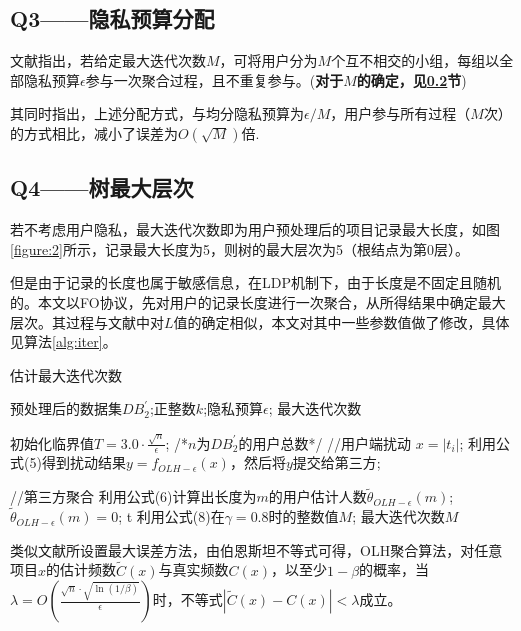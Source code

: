 \documentclass[UTF8,a4paper]{ctexart}
\begin{document}
  \subsection{Q3——隐私预算分配}
  \label{section:Q3}
  文献\cite{wang2018privtrie}指出，若给定最大迭代次数$M$，可将用户分为$M$个互不相交的小组，每组以全部隐私预算$\epsilon$参与一次聚合过程，且不重复参与。(\textbf{对于$M$的确定，见\ref{section:Q4}节})

  其同时指出，上述分配方式，与均分隐私预算为$\epsilon/M$，用户参与所有过程（$M$次）的方式相比，减小了误差为$O(\sqrt{M})$倍.

  \subsection{Q4——树最大层次}
  \label{section:Q4}
  若不考虑用户隐私，最大迭代次数即为用户预处理后的项目记录最大长度，如图\ref{figure:2}所示，记录最大长度为5，则树的最大层次为5（根结点为第0层）。

  但是由于记录的长度也属于敏感信息，在LDP机制下，由于长度是不固定且随机的。本文以FO协议，先对用户的记录长度进行一次聚合，从所得结果中确定最大层次。其过程与文献\cite{wang2018locally}中对$L$值的确定相似，本文对其中一些参数值做了修改，具体见算法\ref{alg:iter}。

\begin{algorithm}[h]
\caption{估计最大迭代次数}
\label{alg:iter}
\begin{algorithmic}[1]
\REQUIRE 预处理后的数据集$DB^{\prime}_{2}$;正整数$k$;隐私预算$\epsilon$;
\ENSURE 最大迭代次数

\STATE 初始化临界值$T=3.0 \cdot \frac{\sqrt{n}}{\epsilon}$; /*$n$为$DB^{\prime}_{2}$的用户总数*/
\label{T threshold}
\STATE //用户端扰动
\STATE $x=\left|t_{i}\right|$;
\STATE 利用公式(5)得到扰动结果$y=f_{OLH-\epsilon}(x)$，然后将$y$提交给第三方;
\ENDFOR

  \STATE //第三方聚合
  \STATE 利用公式(6)计算出长度为$m$的用户估计人数$\tilde{\theta}_{OLH-\epsilon}(m)$;
    \STATE $\tilde{\theta}_{OLH-\epsilon}(m) = 0$;
  \ENDIF
\ENDFOR
t
\STATE 利用公式(8)在$\gamma=0.8$时的整数值$M$;
\label{gamma=0.8}
\RETURN 最大迭代次数$M$
\end{algorithmic}
\end{algorithm}


  类似文献\cite{wang2018privtrie}所设置最大误差方法，由伯恩斯坦不等式可得，OLH聚合算法，对任意项目$x$的估计频数$\tilde{C}(x)$与真实频数$C(x)$，以至少$1 - \beta$的概率，当$\lambda = O \left( \frac{\sqrt{n} \cdot \sqrt{\ln{(1/\beta)}}}{\epsilon} \right)$时，不等式$\left| \tilde{C}(x) - C(x) \right| < \lambda$成立。
  
\end{document}
